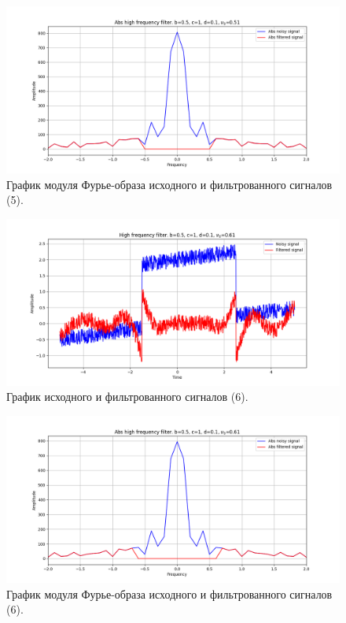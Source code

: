 \documentclass[a4paper, 12pt]{article}
\begin{document}
    \begin{figure}[!htb]
        \centering
        \includegraphics[scale=0.48]{5_abs_u_U_nolow.png}
        \captionsetup{skip=0pt}
        \caption{График модуля Фурье-образа исходного и фильтрованного сигналов (5).}
        \label{fig:fig36}
    \end{figure}
    \begin{figure}[!htb]
        \centering
        \includegraphics[scale=0.48]{6_u_flt_u_nolow.png}
        \captionsetup{skip=0pt}
        \caption{График исходного и фильтрованного сигналов (6).}
        \label{fig:fig37}
    \end{figure}
    \newpage
    \begin{figure}[!htb]
        \centering
        \includegraphics[scale=0.48]{6_abs_u_U_nolow.png}
        \captionsetup{skip=0pt}
        \caption{График модуля Фурье-образа исходного и фильтрованного сигналов (6).}
        \label{fig:fig38}
    \end{figure}
\end{document}
